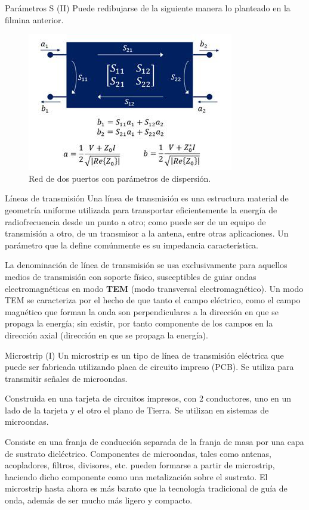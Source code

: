 \documentclass[9pt]{beamer}
\begin{document}
	\begin{frame}{Parámetros S (II)}
		Puede redibujarse de la siguiente manera lo planteado en la filmina anterior.
		\begin{figure}
			\centering
			\includegraphics[width=0.6\linewidth]{img/s_block}
			\caption{Red de dos puertos con parámetros de dispersión.}
			\label{fig:sblock}
		\end{figure}
		
	\end{frame}
	
	\begin{frame}{Líneas de transmisión}
		Una línea de transmisión es una estructura material de geometría uniforme utilizada para transportar eficientemente la energía de radiofrecuencia desde un punto a otro; como puede ser de un equipo de transmisión a otro, de un transmisor a la antena, entre otras aplicaciones. Un parámetro que la define comúnmente es su impedancia característica.
		
		La denominación de línea de transmisión se usa exclusivamente para aquellos medios de transmisión con soporte físico, susceptibles de guiar ondas electromagnéticas en modo \textbf{TEM} (modo transversal electromagnético). Un modo TEM se caracteriza por el hecho de que tanto el campo eléctrico, como el campo magnético que forman la onda son perpendiculares a la dirección en que se propaga la energía; sin existir, por tanto componente de los campos en la dirección axial (dirección en que se propaga la energía).
	\end{frame}
	
	\begin{frame}{Microstrip (I)}
		Un microstrip es un tipo de línea de transmisión eléctrica que puede ser fabricada utilizando placa de circuito impreso (PCB). Se utiliza para transmitir señales de microondas.
		
		Construida en una tarjeta de circuitos impresos, con 2 conductores, uno en un lado de la tarjeta y el otro el plano de Tierra. Se utilizan en sistemas de microondas.
		
		Consiste en una franja de conducción separada de la franja de masa por una capa de sustrato dieléctrico. Componentes de microondas, tales como antenas, acopladores, filtros, divisores, etc. pueden formarse a partir de microstrip, haciendo dicho componente como una metalización sobre el sustrato. El microstrip hasta ahora es más barato que la tecnología tradicional de guía de onda, además de ser mucho más ligero y compacto.
	\end{frame}
	
\end{document}
